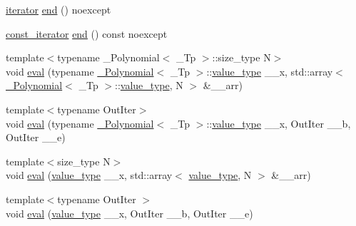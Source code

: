 \begin{DoxyCompactItemize}
\item 
\hyperlink{class____gnu__cxx_1_1__Polynomial_a64bd557b6af46992e352dbe9e30fa201}{iterator} \hyperlink{class____gnu__cxx_1_1__Polynomial_a7997059cf934fc454497be9074ebc958}{end} () noexcept
\item 
\hyperlink{class____gnu__cxx_1_1__Polynomial_a96e4523cc2a834724fe4224f0800486b}{const\+\_\+iterator} \hyperlink{class____gnu__cxx_1_1__Polynomial_a3f971eb02150e9ca66e8222ba4a5aa3d}{end} () const noexcept
\item 
{\footnotesize template$<$typename \+\_\+\+Polynomial$<$ \+\_\+\+Tp $>$\+::size\+\_\+type N$>$ }\\void \hyperlink{class____gnu__cxx_1_1__Polynomial_a5558b16a9a4b594e506d30e5d10289b4}{eval} (typename \hyperlink{class____gnu__cxx_1_1__Polynomial}{\+\_\+\+Polynomial}$<$ \+\_\+\+Tp $>$\+::\hyperlink{class____gnu__cxx_1_1__Polynomial_a725563351f50e76084a7a016c06f8a53}{value\+\_\+type} \+\_\+\+\_\+x, std\+::array$<$ \hyperlink{class____gnu__cxx_1_1__Polynomial}{\+\_\+\+Polynomial}$<$ \+\_\+\+Tp $>$\+::\hyperlink{class____gnu__cxx_1_1__Polynomial_a725563351f50e76084a7a016c06f8a53}{value\+\_\+type}, N $>$ \&\+\_\+\+\_\+arr)
\item 
{\footnotesize template$<$typename Out\+Iter$>$ }\\void \hyperlink{class____gnu__cxx_1_1__Polynomial_a2251cb8f6518118c78494f4eb015ed8f}{eval} (typename \hyperlink{class____gnu__cxx_1_1__Polynomial}{\+\_\+\+Polynomial}$<$ \+\_\+\+Tp $>$\+::\hyperlink{class____gnu__cxx_1_1__Polynomial_a725563351f50e76084a7a016c06f8a53}{value\+\_\+type} \+\_\+\+\_\+x, Out\+Iter \+\_\+\+\_\+b, Out\+Iter \+\_\+\+\_\+e)
\item 
{\footnotesize template$<$size\+\_\+type N$>$ }\\void \hyperlink{class____gnu__cxx_1_1__Polynomial_a3c3b539828301eef5385bc5b230a844a}{eval} (\hyperlink{class____gnu__cxx_1_1__Polynomial_a725563351f50e76084a7a016c06f8a53}{value\+\_\+type} \+\_\+\+\_\+x, std\+::array$<$ \hyperlink{class____gnu__cxx_1_1__Polynomial_a725563351f50e76084a7a016c06f8a53}{value\+\_\+type}, N $>$ \&\+\_\+\+\_\+arr)
\item 
{\footnotesize template$<$typename Out\+Iter $>$ }\\void \hyperlink{class____gnu__cxx_1_1__Polynomial_a409ca632845c145fcf08f8c3e8eeae63}{eval} (\hyperlink{class____gnu__cxx_1_1__Polynomial_a725563351f50e76084a7a016c06f8a53}{value\+\_\+type} \+\_\+\+\_\+x, Out\+Iter \+\_\+\+\_\+b, Out\+Iter \+\_\+\+\_\+e)
\item 

\end{DoxyCompactItemize}

